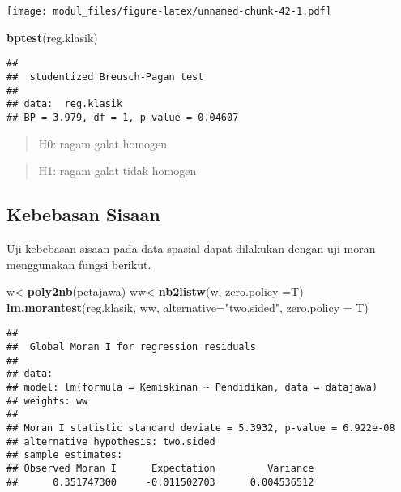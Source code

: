 \documentclass[
]{book}
\newenvironment{Shaded}{\begin{snugshade}}{\end{snugshade}}
\newcommand{\DataTypeTok}[1]{\textcolor[rgb]{0.13,0.29,0.53}{#1}}
\newcommand{\KeywordTok}[1]{\textcolor[rgb]{0.13,0.29,0.53}{\textbf{#1}}}
\newcommand{\NormalTok}[1]{#1}
\newcommand{\StringTok}[1]{\textcolor[rgb]{0.31,0.60,0.02}{#1}}
\begin{document}
\texttt{[image: modul\_files/figure-latex/unnamed-chunk-42-1.pdf]}

\begin{Shaded}
\begin{Highlighting}[]
\KeywordTok{bptest}\NormalTok{(reg.klasik)}
\end{Highlighting}
\end{Shaded}

\begin{verbatim}
## 
##  studentized Breusch-Pagan test
## 
## data:  reg.klasik
## BP = 3.979, df = 1, p-value = 0.04607
\end{verbatim}

\begin{quote}
H0: ragam galat homogen
\end{quote}

\begin{quote}
H1: ragam galat tidak homogen
\end{quote}

\hypertarget{kebebasan-sisaan}{%
\subsection{Kebebasan Sisaan}\label{kebebasan-sisaan}}

Uji kebebasan sisaan pada data spasial dapat dilakukan dengan uji moran menggunakan fungsi berikut.

\begin{Shaded}
\begin{Highlighting}[]
\NormalTok{w\textless{}{-}}\KeywordTok{poly2nb}\NormalTok{(petajawa)}
\NormalTok{ww\textless{}{-}}\KeywordTok{nb2listw}\NormalTok{(w, }\DataTypeTok{zero.policy =}\NormalTok{T)}
\KeywordTok{lm.morantest}\NormalTok{(reg.klasik, ww, }\DataTypeTok{alternative=}\StringTok{"two.sided"}\NormalTok{, }\DataTypeTok{zero.policy =}\NormalTok{ T)}
\end{Highlighting}
\end{Shaded}

\begin{verbatim}
## 
##  Global Moran I for regression residuals
## 
## data:  
## model: lm(formula = Kemiskinan ~ Pendidikan, data = datajawa)
## weights: ww
## 
## Moran I statistic standard deviate = 5.3932, p-value = 6.922e-08
## alternative hypothesis: two.sided
## sample estimates:
## Observed Moran I      Expectation         Variance 
##      0.351747300     -0.011502703      0.004536512
\end{verbatim}
\end{document}
